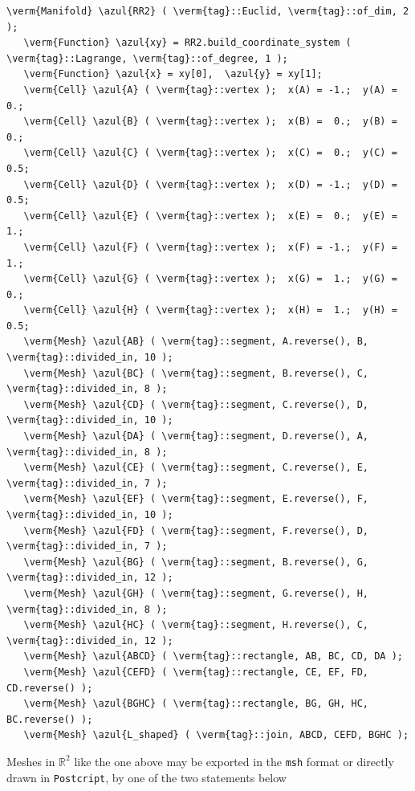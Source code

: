 \begin{Verbatim}[commandchars=\\\{\},formatcom=\small\tt,frame=single,
   label=main-\ref{\numb section 1.\numb parag 3}.cpp,rulecolor=\color{coment},
   baselinestretch=0.94,framesep=2mm]
   \verm{Manifold} \azul{RR2} ( \verm{tag}::Euclid, \verm{tag}::of_dim, 2 );
   \verm{Function} \azul{xy} = RR2.build_coordinate_system ( \verm{tag}::Lagrange, \verm{tag}::of_degree, 1 );
   \verm{Function} \azul{x} = xy[0],  \azul{y} = xy[1];
   \verm{Cell} \azul{A} ( \verm{tag}::vertex );  x(A) = -1.;  y(A) = 0.;
   \verm{Cell} \azul{B} ( \verm{tag}::vertex );  x(B) =  0.;  y(B) = 0.;
   \verm{Cell} \azul{C} ( \verm{tag}::vertex );  x(C) =  0.;  y(C) = 0.5;
   \verm{Cell} \azul{D} ( \verm{tag}::vertex );  x(D) = -1.;  y(D) = 0.5;
   \verm{Cell} \azul{E} ( \verm{tag}::vertex );  x(E) =  0.;  y(E) = 1.;
   \verm{Cell} \azul{F} ( \verm{tag}::vertex );  x(F) = -1.;  y(F) = 1.;
   \verm{Cell} \azul{G} ( \verm{tag}::vertex );  x(G) =  1.;  y(G) = 0.;
   \verm{Cell} \azul{H} ( \verm{tag}::vertex );  x(H) =  1.;  y(H) = 0.5;
   \verm{Mesh} \azul{AB} ( \verm{tag}::segment, A.reverse(), B, \verm{tag}::divided_in, 10 );
   \verm{Mesh} \azul{BC} ( \verm{tag}::segment, B.reverse(), C, \verm{tag}::divided_in, 8 );
   \verm{Mesh} \azul{CD} ( \verm{tag}::segment, C.reverse(), D, \verm{tag}::divided_in, 10 );
   \verm{Mesh} \azul{DA} ( \verm{tag}::segment, D.reverse(), A, \verm{tag}::divided_in, 8 );
   \verm{Mesh} \azul{CE} ( \verm{tag}::segment, C.reverse(), E, \verm{tag}::divided_in, 7 );
   \verm{Mesh} \azul{EF} ( \verm{tag}::segment, E.reverse(), F, \verm{tag}::divided_in, 10 );
   \verm{Mesh} \azul{FD} ( \verm{tag}::segment, F.reverse(), D, \verm{tag}::divided_in, 7 );
   \verm{Mesh} \azul{BG} ( \verm{tag}::segment, B.reverse(), G, \verm{tag}::divided_in, 12 );
   \verm{Mesh} \azul{GH} ( \verm{tag}::segment, G.reverse(), H, \verm{tag}::divided_in, 8 );
   \verm{Mesh} \azul{HC} ( \verm{tag}::segment, H.reverse(), C, \verm{tag}::divided_in, 12 );
   \verm{Mesh} \azul{ABCD} ( \verm{tag}::rectangle, AB, BC, CD, DA );
   \verm{Mesh} \azul{CEFD} ( \verm{tag}::rectangle, CE, EF, FD, CD.reverse() );
   \verm{Mesh} \azul{BGHC} ( \verm{tag}::rectangle, BG, GH, HC, BC.reverse() );
   \verm{Mesh} \azul{L_shaped} ( \verm{tag}::join, ABCD, CEFD, BGHC );
\end{Verbatim}

Meshes in $ \mathbb{R}^2 $ like the one above may be exported in the {\small\tt msh} format
or directly drawn in {\small\tt Postcript}, by one of the two statements below


